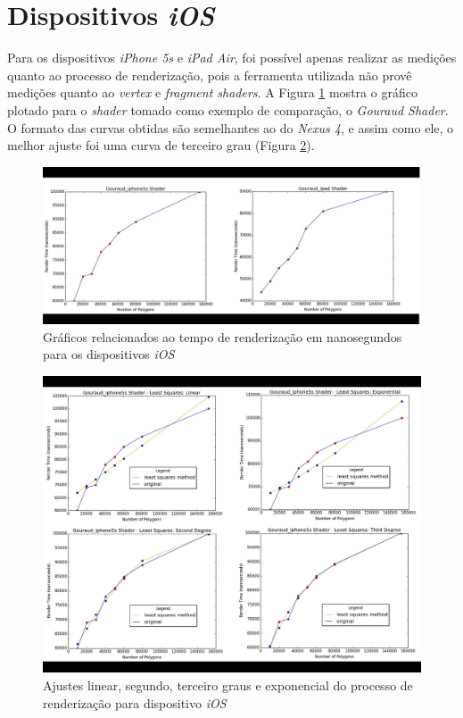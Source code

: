\section{Dispositivos \textit{iOS}} 

	Para os dispositivos \textit{iPhone 5s} e \textit{iPad Air}, foi possível apenas realizar as medições quanto ao processo de renderização, pois a ferramenta utilizada não provê medições quanto ao \textit{vertex} e \textit{fragment shaders}.  A Figura \ref{ios1} mostra o gráfico plotado para o \textit{shader} tomado como exemplo de comparação, o \textit{Gouraud Shader}. O formato das curvas obtidas são semelhantes ao do \textit{Nexus 4}, e assim como ele, o melhor ajuste foi uma curva de terceiro grau (Figura \ref{ios1_ajuste}). 

	\begin{figure}[ht]
	\centering
		\includegraphics[keepaspectratio=true,scale=0.35]{figuras/ios_render_time.jpg}
	\caption{Gráficos relacionados ao tempo de renderização em nanosegundos para os dispositivos \textit{iOS}}
	\label{ios1}
	\end{figure}	

	\begin{figure}[ht]
	\centering
		\includegraphics[keepaspectratio=true,scale=0.4]{figuras/ios_minquad_render.jpg}
	\caption{Ajustes linear, segundo, terceiro graus e exponencial do processo de renderização para dispositivo \textit{iOS}}
	\label{ios1_ajuste}
	\end{figure}	

